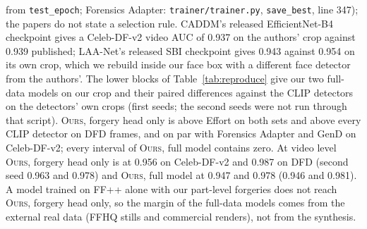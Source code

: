 \documentclass[10pt]{article}
\newcommand{\oursB}{\textsc{Ours}, forgery head only}
\newcommand{\oursF}{\textsc{Ours}, full model}
\begin{document}
from \texttt{test\_epoch}; Forensics Adapter: \texttt{trainer/trainer.py}, \texttt{save\_best}, line 347); the papers do not state a
selection rule. CADDM's released EfficientNet-B4 checkpoint gives a Celeb-DF-v2 video AUC of 0.937 on the authors' crop against
0.939 published; LAA-Net's released SBI checkpoint gives 0.943 against 0.954 on its own crop, which we rebuild inside our face
box with a different face detector from the authors'. The lower blocks of Table~\ref{tab:reproduce} give our two full-data
models on our crop and their paired differences against the CLIP detectors on the detectors' own crops (first seeds; the second
seeds were not run through that script). \oursB{} is above Effort on both sets and above every CLIP detector on DFD frames, and on
par with Forensics Adapter and GenD on Celeb-DF-v2; every interval of \oursF{} contains zero. At video
level \oursB{} is at 0.956 on Celeb-DF-v2 and 0.987 on DFD (second seed 0.963 and 0.978) and \oursF{} at 0.947 and 0.978 (0.946
and 0.981). A model trained on FF++ alone with our part-level forgeries does not reach \oursB{}, so the margin of the full-data
models comes from the external real data (FFHQ stills and commercial renders), not from the synthesis.
\end{document}
